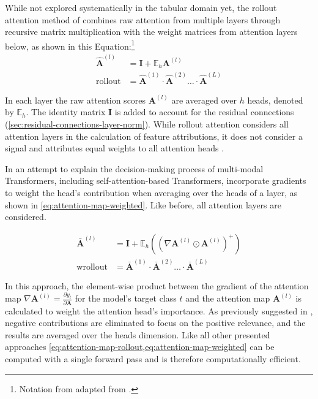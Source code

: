 While not explored systematically in the tabular domain yet, the rollout attention method of \textcite[][3]{abnarQuantifyingAttentionFlow2020} combines raw attention from multiple layers through recursive matrix multiplication with the weight matrices from attention layers below, as shown in this Equation:\footnote{Notation from adapted from \textcite[][786]{cheferTransformerInterpretabilityAttention2021}.}
\begin{equation}
    \begin{aligned}
        \hat{\mathbf{A}}^{(l)}    & =\mathbf{I}+\mathbb{E}_h \mathbf{A}^{(l)}                                              \\
        \operatorname { rollout } & =\hat{\mathbf{A}}^{(1)} \cdot \hat{\mathbf{A}}^{(2)} \ldots\cdot\hat{\mathbf{A}}^{(L)}
    \end{aligned}
    \label{eq:attention-map-rollout}
\end{equation}

In each layer the raw attention scores $\mathbf{A}^{(l)}$ are averaged over $h$ heads, denoted by $\mathbb{E}_h$. The identity matrix $\mathbf{I}$ is added to account for the residual connections (\cref{sec:residual-connections-layer-norm}). While rollout attention considers all attention layers in the calculation of feature attributions, it does not consider a signal and attributes equal weights to all attention heads \autocite[][786]{cheferTransformerInterpretabilityAttention2021}.

In an attempt to explain the decision-making process of multi-modal Transformers, including self-attention-based Transformers, \textcite[][3]{cheferTransformerInterpretabilityAttention2021} incorporate gradients to weight the head's contribution when averaging over the heads of a layer, as shown in \cref{eq:attention-map-weighted}. Like before, all attention layers are considered.

\begin{equation}
    \begin{aligned}
        \bar{\mathbf{A}}^{(l)}   & =\mathbf{I} + \mathbb{E}_h\left(\left(\nabla \mathbf{A}^{(l)} \odot \mathbf{A}^{(l)}\right)^{+}\right) \\
        \operatorname {wrollout} & =\bar{\mathbf{A}}^{(1)} \cdot \bar{\mathbf{A}}^{(2)} \ldots \cdot \bar{\mathbf{A}}^{(L)}
    \end{aligned}
    \label{eq:attention-map-weighted}
\end{equation}

In this approach, the element-wise product between the gradient of the attention map $\nabla \mathbf{A}^{(l)}=\frac{\partial y_t}{\partial \mathbf{A}}$ for the model's target class $t$ and the attention map $\mathbf{A}^{(l)}$ is calculated to weight the attention head's importance. As previously suggested in \textcite[][786]{cheferTransformerInterpretabilityAttention2021}, negative contributions are eliminated to focus on the positive relevance, and the results are averaged over the heads dimension. Like all other presented approaches \cref{eq:attention-map-rollout,eq:attention-map-weighted} can be computed with a single forward pass and is therefore computationally efficient.